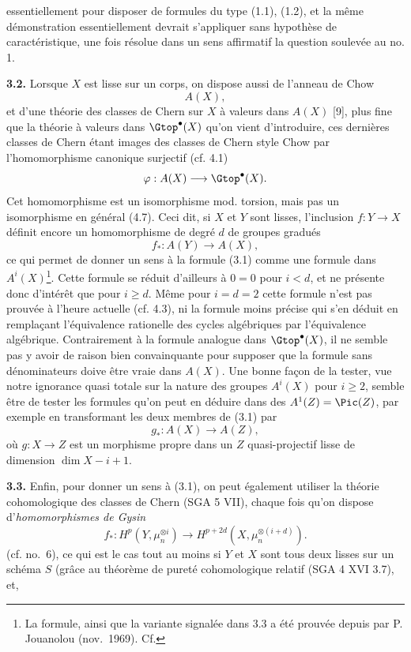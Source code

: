 essentiellement pour disposer de formules du type (1.1), (1.2), et la même démonstration essentiellement devrait s'appliquer sans hypothèse de caractéristique, une fois résolue dans un sens affirmatif la question soulevée au no. 1.

\textbf{3.2.} Lorsque $X$ est lisse sur un corps, on dispose aussi de l'anneau de Chow
\[
 A(X),
\]
et d'une théorie des classes de Chern sur $X$ à valeurs dans $A(X)$ [9], plus fine que la théorie à valeurs dans $\Gtop^\bullet(X)$ qu'on vient d'introduire, ces dernières classes de Chern étant images des classes de Chern style Chow par l'homomorphisme canonique surjectif (cf. 4.1)
\[
 \varphi:A(X)\longrightarrow \Gtop^\bullet(X).
\]
Cet homomorphisme est un isomorphisme mod. torsion, mais pas un isomorphisme en général (4.7). Ceci dit, si $X$ et $Y$ sont lisses, l'inclusion $f:Y\to X$ définit encore un homomorphisme de degré $d$ de groupes gradués
\[
 f_*:A(Y)\longrightarrow A(X),
\]
ce qui permet de donner un sens à la formule (3.1) comme une formule dans $A^i(X)$\footnote{La formule, ainsi que la variante signalée dans 3.3 a été prouvée depuis par P. Jouanolou (nov.\ 1969). Cf.}. Cette formule se réduit d'ailleurs à $0=0$ pour $i<d$, et ne présente donc d'intérêt que pour $i\geq d$. Même pour $i=d=2$ cette formule n'est pas prouvée à l'heure actuelle (cf. 4.3), ni la formule moins précise qui s'en déduit en remplaçant l'équivalence rationelle des cycles algébriques par l'équivalence algébrique. Contrairement à la formule analogue dans $\Gtop^\bullet(X)$, il ne semble pas y avoir de raison bien convainquante pour supposer que la formule sans dénominateurs doive être vraie dans $A(X)$. Une bonne façon de la tester, vue notre ignorance quasi totale sur la nature des groupes $A^i(X)$ pour $i\geq 2$, semble être de tester les formules qu'on peut en déduire dans des $A^1(Z)=\Pic(Z)$, par exemple en transformant les deux membres de (3.1) par
\[
 g_*:A(X)\longrightarrow A(Z),
\]
où $g:X\to Z$ est un morphisme propre dans un $Z$ quasi-projectif lisse de dimension $\dim X-i+1$.

\textbf{3.3.} Enfin, pour donner un sens à (3.1), on peut également utiliser la théorie cohomologique des classes de Chern (SGA 5 VII), chaque fois qu'on dispose d'\emph{homomorphismes de Gysin}
\[
 f_*:H^p(Y,\mu_n^{\otimes i})\longrightarrow H^{p+2d}(X,\mu_n^{\otimes(i+d)}).
\]
(cf. no.~6), ce qui est le cas tout au moins si $Y$ et $X$ sont tous deux lisses sur un schéma $S$ (grâce au théorème de pureté cohomologique relatif (SGA 4 XVI 3.7), et,
